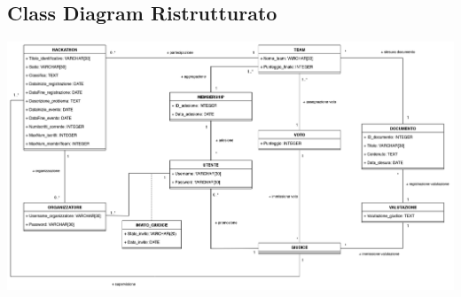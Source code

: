 \documentclass[a4paper, 10pt]{article}
\begin{document}
	\subsection{Class Diagram Ristrutturato}
	\includegraphics[width=1\textwidth]{../Immagini/Hackathon_UMLRistrutturato}
	\newpage
\end{document}
